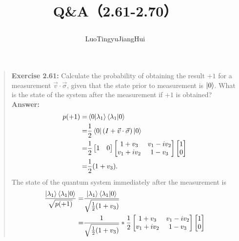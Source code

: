 \documentclass[UTF8]{ctexart}
\begin{document}
	\title{\textbf{Q\&A（2.61-2.70）}\\[1ex]\begin{large}
		\end{large}}
	\author{LuoTingyu\quad JiangHui}
	\maketitle
\begin{quote}
\textbf{Exercise 2.61: } Calculate the probability of obtaining the result 
$+1$ for a measurement $\vec{v}\cdot \vec{\sigma}$, given that the state 
prior to measurement is $\ket{0}$. What is the state of the system after 
the measurement if $+1$ is obtained?
\\
\textbf{Answer:}\\
\begin{equation}
	\begin{aligned}
		p(+1)=&\bra{0}\ket{\lambda_{1}}\bra{\lambda_{1}}\ket{0} \\
			 =&\frac{1}{2}\bra{0}(I+\vec{v}\cdot\vec{\sigma})\ket{0} \\
			 =&\frac{1}{2}\begin{bmatrix}
				 1 & 0
			 \end{bmatrix}\begin{bmatrix}
				1+v_{3} & v_{1}-iv_{2} \\ v_{1}+iv_{2} & 1-v_{3}
			\end{bmatrix}
			\begin{bmatrix}
				1 \\ 0
			\end{bmatrix}
			\\
			=&\frac{1}{2}(1+v_{3}).
	\end{aligned}
\end{equation} 
The state of the quantum system immediately after the measurement is
\\
\begin{equation}
	\begin{aligned}
		\frac{\ket{\lambda_{1}}\bra{\lambda_{1}}\ket{0}}{\sqrt{p(+1)}}=&
		\frac{\ket{\lambda_{1}}\bra{\lambda_{1}}\ket{0}}{\sqrt{\frac{1}{2}(1+v_{3})}}\\
		=&\frac{1}{\sqrt{\frac{1}{2}(1+v_{3})}}*\frac{1}{2}\begin{bmatrix}
			1+v_{3} & v_{1}-iv_{2} \\ v_{1}+iv_{2} & 1-v_{3}
		\end{bmatrix}
		\begin{bmatrix}
			1 \\ 0

\end{bmatrix}
\end{aligned}
\end{equation}
\end{quote}
\end{document}
